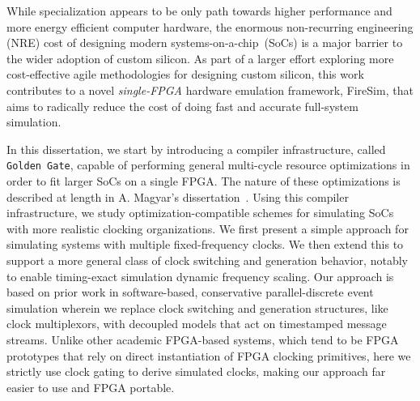 While specialization appears to be only path towards higher performance and more
energy efficient computer hardware, the enormous non-recurring engineering (NRE) cost
of designing modern systems-on-a-chip~(SoCs) is a major barrier to the wider
adoption of custom silicon. As part of a larger effort exploring more
cost-effective agile methodologies for designing custom silicon, this work
contributes to a novel \emph{single-FPGA} hardware emulation framework, FireSim, that aims to
radically reduce the cost of doing fast and accurate full-system simulation.

In this dissertation, we start by introducing a compiler infrastructure, called
\texttt{Golden Gate}, capable of performing general multi-cycle resource
optimizations in order to fit larger SoCs on a single FPGA. The
nature of these optimizations is described at length in A. Magyar's
dissertation~\cite{MagyarDissertation}. Using this compiler infrastructure, we
study optimization-compatible schemes for simulating SoCs with more realistic
clocking organizations.  We first present a simple approach for simulating
systems with multiple fixed-frequency clocks.  We then extend this to support a
more general class of clock switching and generation behavior, notably to
enable timing-exact simulation dynamic frequency scaling. Our approach is based
on prior work in software-based, conservative parallel-discrete event
simulation wherein we replace clock switching and generation structures, like
clock multiplexors, with decoupled models that act on timestamped message
streams.  Unlike other academic FPGA-based systems, which tend to be FPGA
prototypes that rely on direct instantiation of FPGA clocking primitives, here
we strictly use clock gating to derive simulated clocks, making our approach
far easier to use and FPGA portable.

